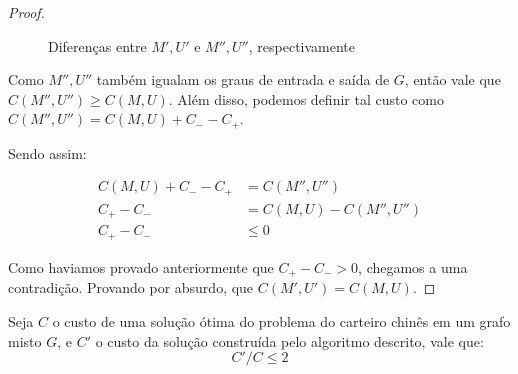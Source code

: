 \begin{proof}
\begin{figure}[H]
\begin{minipage}{.5\textwidth}
            \end{minipage}%
            \caption{ Diferenças entre $M', U'$ e $M'', U''$, respectivamente}
            \label{fig:mixed-ex-lema}
        \end{figure}

        Como $M'', U''$ também igualam os graus de entrada e saída de $G$, então vale que $C(M'', U'') \geq C(M, U)$.
        Além disso, podemos definir tal custo como $C(M'', U'') = C(M, U) + C_- - C_+$.
        
        Sendo assim:

        \begin{align*}
            C(M, U) + C_- - C_+ &= C(M'', U'') \\
            C_+ - C_- &= C(M, U) - C(M'', U'') \\
            C_+ - C_- &\leq 0 
        \end{align*}

        Como haviamos provado anteriormente que $C_+ - C_- > 0$, chegamos a uma contradição.
        Provando por absurdo, que $C(M', U') = C(M, U)$.
    \end{proof}

    \begin{theorem}{\cite{frederickson}}
        Seja $C$ o custo de uma solução ótima do problema do carteiro chinês em um grafo misto $G$, e $C'$ o custo da solução construída pelo algoritmo descrito, vale que:
        \[
            C'/C \leq 2
        \]
    \end{theorem}

